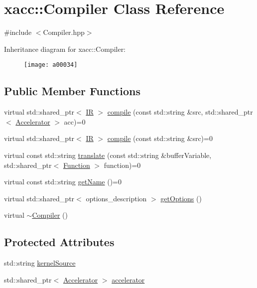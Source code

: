 \hypertarget{a00034}{}\section{xacc\+:\+:Compiler Class Reference}
\label{a00034}


{\ttfamily \#include $<$Compiler.\+hpp$>$}

Inheritance diagram for xacc\+:\+:Compiler\+:\begin{figure}[H]
\begin{center}
\leavevmode
\texttt{[image: a00034]}
\end{center}
\end{figure}
\subsection*{Public Member Functions}
\begin{DoxyCompactItemize}
\item 
virtual std\+::shared\+\_\+ptr$<$ \hyperlink{a00077}{IR} $>$ \hyperlink{a00034_a546a40c95bb93af6a0c0ac48dbeaffc8}{compile} (const std\+::string \&src, std\+::shared\+\_\+ptr$<$ \hyperlink{a00017}{Accelerator} $>$ acc)=0
\item 
virtual std\+::shared\+\_\+ptr$<$ \hyperlink{a00077}{IR} $>$ \hyperlink{a00034_a9092f5f779b570c91569b59621280c04}{compile} (const std\+::string \&src)=0
\item 
virtual const std\+::string \hyperlink{a00034_aeedbe58a33fed29e4d7694ae743e25e7}{translate} (const std\+::string \&buffer\+Variable, std\+::shared\+\_\+ptr$<$ \hyperlink{a00059}{Function} $>$ function)=0
\item 
virtual const std\+::string \hyperlink{a00034_a87fca9100e6462122f5b687c3a0fb3fb}{get\+Name} ()=0
\item 
virtual std\+::shared\+\_\+ptr$<$ options\+\_\+description $>$ \hyperlink{a00034_a9f5a8965c9c2dd895016d18264ebbe92}{get\+Options} ()
\item 
virtual \hyperlink{a00034_a5d0b012687d9b44893872eaa81e47b38}{$\sim$\+Compiler} ()
\end{DoxyCompactItemize}
\subsection*{Protected Attributes}
\begin{DoxyCompactItemize}
\item 
std\+::string \hyperlink{a00034_a0ad81c816c09e5113d03cdc02165c453}{kernel\+Source}
\item 
std\+::shared\+\_\+ptr$<$ \hyperlink{a00017}{Accelerator} $>$ \hyperlink{a00034_ad4cbb467fa7e377bac6c054ffcb22b7c}{accelerator}
\end{DoxyCompactItemize}


